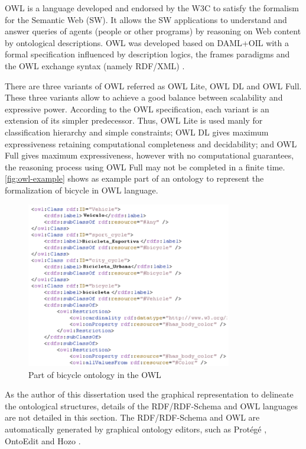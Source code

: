OWL is a language developed and endorsed by the W3C to satisfy the formalism for the Semantic Web (SW).
It allows the SW applications to understand and answer queries of agents (people or other programs) by reasoning on Web content by ontological descriptions.
OWL was developed based on DAML+OIL \cite{Horrocksothers2002} with a formal specification influenced by description logics, the frames paradigms and the OWL exchange syntax (namely RDF/XML) \cite{HorrocksPatel-SchneidervanHarmelen2003}.

There are three variants of OWL referred as OWL Lite, OWL DL and OWL Full.
These three variants allow to achieve a good balance between scalability and expressive power.
According to the OWL specification, each variant is an extension of its simpler predecessor.
Thus, OWL Lite is used manly for classification hierarchy and simple constraints;
OWL DL gives maximum expressiveness retaining computational completeness and decidability; and
OWL Full gives maximum expressiveness, however with no computational guarantees, the reasoning process using OWL Full may not be completed in a finite time.
\autoref{fig:owl-example} shows as example part of an ontology to represent the formalization of bicycle in OWL language.


\begin{figure}[htb]
 \caption{Part of bicycle ontology in the OWL}
 \label{fig:owl-example}
 \centering
 \includegraphics[width=0.8\textwidth]{images/chap-general-background/owl-example.png}
\end{figure}

As the author of this dissertation used the graphical representation to delineate the ontological structures, details of the RDF/RDF-Schema and OWL languages are not detailed in this section.
The RDF/RDF-Schema and OWL are automatically generated by graphical ontology editors, such as Prot\'{e}g\'{e} \cite{NoySintekDeckerCrubezyFergersonMusen2001}, OntoEdit \cite{SureErdmannAngeleStaabStuderWenke2002} and Hozo \cite{KozakiKitamuraIkedaMizoguchi2002}.


